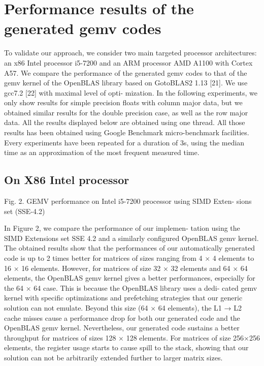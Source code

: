 \documentclass[../../main.tex]{subfiles}
\begin{document}
\section{Performance results of the generated gemv codes}

To validate our approach, we consider two main targeted
processor architectures: an x86 Intel processor i5-7200 and an
ARM processor AMD A1100 with Cortex A57. We compare
the performance of the generated gemv codes to that of the
gemv kernel of the OpenBLAS library based on GotoBLAS2
1.13 [21]. We use gcc7.2 [22] with maximal level of opti-
mization. In the following experiments, we only show results
for simple precision floats with column major data, but we
obtained similar results for the double precision case, as well
as the row major data. All the results displayed below are
obtained using one thread. All those results has been obtained
using Google Benchmark micro-benchmark facilities. Every
experiments have been repeated for a duration of 3s, using
the median time as an approximation of the most frequent
measured time.

\subsection{On X86 Intel processor}

Fig. 2. GEMV performance on Intel i5-7200 processor using SIMD Exten-
sions set (SSE-4.2)

In Figure 2, we compare the performance of our implemen-
tation using the SIMD Extensions set SSE 4.2 and a similarly
configured OpenBLAS gemv kernel. The obtained results show
that the performances of our automatically generated code is
up to 2 times better for matrices of sizes ranging from 4 × 4
elements to 16 × 16 elements. However, for matrices of size
32 × 32 elements and 64 × 64 elements, the OpenBLAS gemv
kernel gives a better performances, especially for the 64 × 64
case. This is because the OpenBLAS library uses a dedi-
cated gemv kernel with specific optimizations and prefetching
strategies that our generic solution can not emulate. Beyond
this size (64 × 64 elements), the L1 → L2 cache misses
cause a performance drop for both our generated code and
the OpenBLAS gemv kernel. Nevertheless, our generated code
sustains a better throughput for matrices of sizes 128 × 128
elements. For matrices of size 256×256 elements, the register
usage starts to cause spill to the stack, showing that our
solution can not be arbitrarily extended further to larger matrix
sizes.
\end{document}
